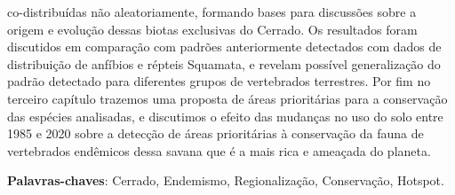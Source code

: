 \documentclass[12pt,openright,oneside,a4paper,english]{abntex2}
\begin{document}
\begin{resumo}[Resumo]
co-distribuídas não aleatoriamente, formando bases para discussões sobre a origem e evolução dessas biotas exclusivas do Cerrado. Os resultados foram discutidos em comparação com padrões anteriormente detectados com dados de distribuição de anfíbios e répteis Squamata, e revelam possível generalização do padrão detectado para diferentes grupos de vertebrados terrestres. Por fim no terceiro capítulo trazemos uma proposta de áreas prioritárias para a conservação das espécies analisadas, e discutimos o efeito das mudanças no uso do solo entre 1985 e 2020 sobre a detecção de áreas prioritárias à conservação da fauna de vertebrados endêmicos dessa savana que é a mais rica e ameaçada do planeta.
	\vspace{\onelineskip}
	\noindent
	
	\textbf{Palavras-chaves}: Cerrado, Endemismo, Regionalização, Conservação, Hotspot.
\end{resumo}
\end{document}
